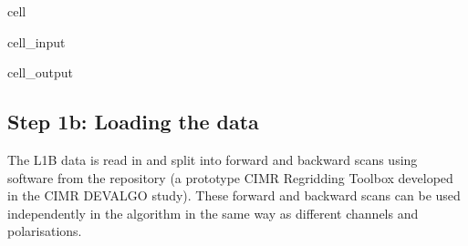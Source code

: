 \documentclass[letterpaper,10pt,english]{jupyterBook}
\begin{document}
\begin{sphinxuseclass}{cell}
\begin{sphinxVerbatimInput}
\begin{sphinxuseclass}{cell_input}
\begin{sphinxVerbatim}[commandchars=\\\{\}]
  
\PYG{p}{[}  \PYG{p}{]}  

  
\PYG{p}{[}  \PYG{p}{]}  
\end{sphinxVerbatim}

\end{sphinxuseclass}\end{sphinxVerbatimInput}
\begin{sphinxVerbatimOutput}

\begin{sphinxuseclass}{cell_output}
\noindent{}

\end{sphinxuseclass}\end{sphinxVerbatimOutput}

\end{sphinxuseclass}

\subsection{Step 1b: Loading the data}
\label{\detokenize{CIMR_L2_Sea_Ice_Drift_algorithm:step-1b-loading-the-data}}
\sphinxAtStartPar
The L1B data is read in and split into forward and backward scans using software from the  repository (a prototype CIMR Regridding Toolbox developed in the CIMR DEVALGO study). These forward and backward scans can be used independently in the algorithm in the same way as different channels and polarisations.
\end{document}
